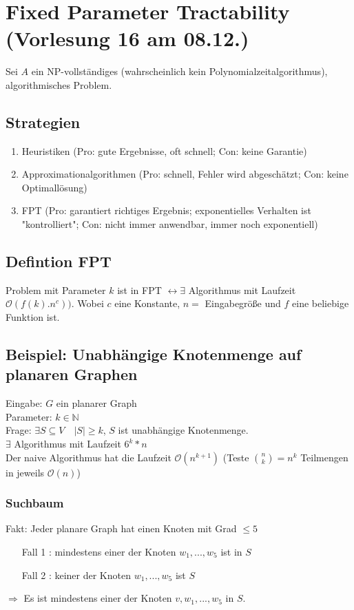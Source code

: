 \section{ Fixed Parameter Tractability \tiny (Vorlesung 16 am 08.12.)}

Sei $A$ ein NP-vollständiges (wahrscheinlich kein Polynomialzeitalgorithmus), algorithmisches Problem.\\
\subsection{Strategien}
\begin{enumerate}
\item Heuristiken (Pro: gute Ergebnisse, oft schnell; Con: keine Garantie)
\item Approximationalgorithmen (Pro: schnell, Fehler wird abgeschätzt; Con: keine Optimallösung)
\item FPT (Pro: garantiert richtiges Ergebnis; exponentielles Verhalten ist "kontrolliert"; Con: nicht immer anwendbar, immer noch exponentiell)
\end{enumerate}
\subsection{Defintion FPT}
Problem mit Parameter $k$ ist in FPT $\leftrightarrow \exists$ Algorithmus mit Laufzeit $\mathcal{O}(f(k).n^c))$. Wobei $c$ eine Konstante, $n=$ Eingabegröße und $f$ eine beliebige Funktion ist.\\
\subsection{Beispiel: Unabhängige Knotenmenge auf planaren Graphen}
Eingabe: $G$ ein planarer Graph \\
Parameter: $k \in \mathbb{N}$\\
Frage: $\exists S \subseteq V \quad |S| \geq k$, $S$ ist unabhängige Knotenmenge.\\
$\exists$ Algorithmus mit Laufzeit $6^k*n$\\
Der naive Algorithmus hat die Laufzeit $\mathcal{O}(n^{k+1})$ (Teste $\binom{n}{k} = n^k$ Teilmengen in jeweils $\mathcal{O}(n)$)\\
\subsubsection{Suchbaum}
Fakt: Jeder planare Graph hat einen Knoten mit Grad $\leq 5$
\begin{enumerate}
\item[Fall 1]:  mindestens einer der Knoten $w_1, ... , w_5$ ist in $S$
\item[Fall 2]: keiner der Knoten $w_1, ... , w_5$ ist $S$
\end{enumerate}
$\Rightarrow$ Es ist mindestens einer der Knoten $v, w_1, ... , w_5$ in $S$.
